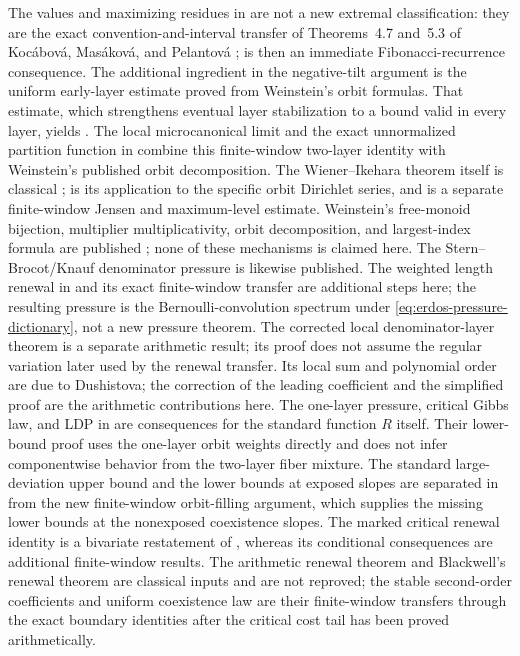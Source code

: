 The values and maximizing residues in
 are not a new extremal classification:
they are the exact convention-and-interval transfer of Theorems~4.7 and~5.3 of
Koc\'abov\'a, Mas\'akov\'a, and Pelantov\'a
\cite{KocabovaMasakovaPelantova2005};
 is then an immediate Fibonacci-recurrence
consequence.  The additional ingredient in the negative-tilt argument is the
uniform early-layer estimate proved from Weinstein's orbit formulas.  That
estimate, which strengthens eventual layer stabilization to a bound valid in
every layer, yields .  The local
microcanonical limit and the exact unnormalized
partition function in  combine this finite-window
two-layer identity with Weinstein's published orbit decomposition.  The
Wiener--Ikehara theorem itself is classical \cite{Korevaar2004};
 is its application to the specific orbit Dirichlet
series, and  is a separate finite-window
Jensen and maximum-level estimate.  Weinstein's free-monoid bijection,
multiplier multiplicativity, orbit decomposition, and largest-index formula
are published
  \cite[Prop.~3.3 and Thms.~3.8, 5.1, and 10.3]{Weinstein2016}; none of
  these mechanisms is claimed here.  The Stern--Brocot/Knauf denominator
  pressure is likewise published.  The weighted length renewal in
   and its exact finite-window transfer
  are additional steps here; the resulting pressure is the
  Bernoulli-convolution spectrum under \eqref{eq:erdos-pressure-dictionary},
  not a new pressure theorem.  The corrected local denominator-layer theorem
   is a separate arithmetic result; its
  proof does not assume the regular variation later used by the renewal
  transfer.  Its local sum and polynomial order are due to Dushistova; the
  correction of the leading coefficient and the simplified proof are the
  arithmetic contributions here.
The one-layer pressure, critical Gibbs law, and LDP in
 are consequences for the
standard function \(R\) itself.  Their lower-bound proof uses the one-layer
orbit weights directly and does not infer componentwise behavior from the
two-layer fiber mixture.
The standard large-deviation upper bound and the lower bounds at exposed
slopes are separated in  from the new finite-window
orbit-filling argument, which supplies the missing lower bounds at the
nonexposed coexistence slopes.
The marked critical renewal identity is a bivariate restatement of
, whereas its conditional consequences
are additional finite-window results.  The arithmetic renewal theorem and
Blackwell's renewal theorem are classical inputs and are not reproved; the
stable second-order coefficients and uniform coexistence law are their
finite-window transfers through the exact boundary identities after the
critical cost tail has been proved arithmetically.

